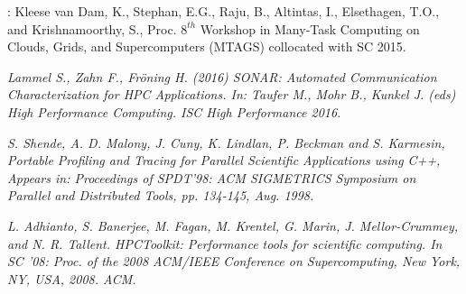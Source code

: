 \documentclass[11pt]{article}
\title{\TITLE{}}
\date{}
\author{\AUTHORS{}}
\begin{document}
\pagestyle{empty}



\newpage

\renewcommand{\contentsname}{{\huge Table of contents}}

\tableofcontents

\clearpage
\maketitle

\pagestyle{plain}
\setcounter{page}{1}











\clearpage
%
%
\begin{thebibliography}{1}

  :
  {Kleese van Dam, K., Stephan, E.G., Raju, B., Altintas, I., Elsethagen, T.O., and Krishnamoorthy, S.}, {Proc. $8^{th}$ Workshop in Many-Task Computing on Clouds, Grids, and Supercomputers (MTAGS) collocated with SC 2015}.
  
   {\em Lammel S., Zahn F., Fröning H. (2016) SONAR: Automated Communication Characterization for HPC Applications. In: Taufer M., Mohr B., Kunkel J. (eds) High Performance Computing. ISC High Performance 2016.}
  
  {\em S. Shende, A. D. Malony, J. Cuny, K. Lindlan, P. Beckman and S. Karmesin, Portable Profiling and Tracing for Parallel Scientific Applications using C++, Appears in: Proceedings of SPDT'98: ACM SIGMETRICS Symposium on Parallel and Distributed Tools, pp. 134-145, Aug. 1998.}
 
 
  {\em L. Adhianto, S. Banerjee, M. Fagan, M. Krentel, G. Marin, J. Mellor-Crummey, and N. R. Tallent. HPCToolkit: Performance tools for scientific computing. In SC '08: Proc. of the 2008 ACM/IEEE Conference on Supercomputing, New York, NY, USA, 2008. ACM.}
 
 \end{thebibliography}
\end{document}
